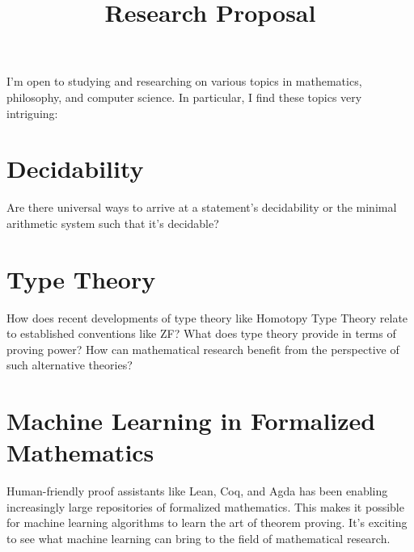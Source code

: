 \documentclass{article}
\title{Research Proposal}
\begin{document}
    \maketitle

    I'm open to studying and researching on various topics in mathematics, philosophy, and computer science.
    In particular, I find these topics very intriguing:

    \section*{Decidability}

    Are there universal ways to arrive at a statement's decidability or the minimal arithmetic system such that it's decidable?

    \section*{Type Theory}

    How does recent developments of type theory like Homotopy Type Theory relate to established conventions like ZF?
    What does type theory provide in terms of proving power?
    How can mathematical research benefit from the perspective of such alternative theories?

    \section*{Machine Learning in Formalized Mathematics}

    Human-friendly proof assistants like Lean, Coq, and Agda has been enabling increasingly large
    repositories of formalized mathematics.
    This makes it possible for machine learning algorithms to learn the art of theorem proving.
    It's exciting to see what machine learning can bring to the field of mathematical research.
\end{document}
